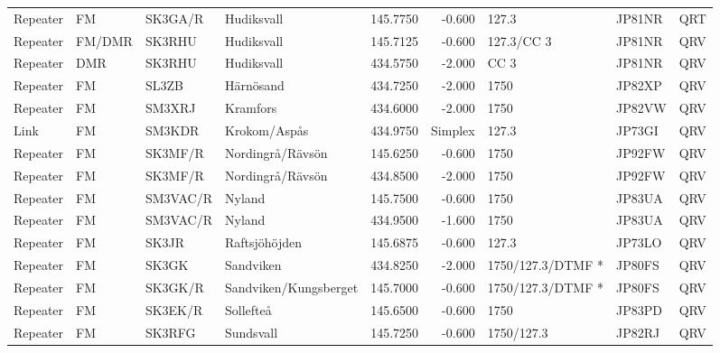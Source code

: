 \begin{landscape}
\begin{longtable}{llllrrlll}
	Repeater & FM              & SK3GA/R  & Hudiksvall            &     145.7750 &     -0.600 & 127.3              & JP81NR      & QRT      \\
	Repeater & FM/DMR          & SK3RHU   & Hudiksvall            &     145.7125 &     -0.600 & 127.3/CC 3         & JP81NR      & QRV      \\
	Repeater & DMR             & SK3RHU   & Hudiksvall            &     434.5750 &     -2.000 & CC 3               & JP81NR      & QRV      \\
	Repeater & FM              & SL3ZB    & Härnösand             &     434.7250 &     -2.000 & 1750               & JP82XP      & QRV      \\
	Repeater & FM              & SM3XRJ   & Kramfors              &     434.6000 &     -2.000 & 1750               & JP82VW      & QRV      \\
	Link     & FM              & SM3KDR   & Krokom/Aspås          &     434.9750 &    Simplex & 127.3              & JP73GI      & QRV      \\
	Repeater & FM              & SK3MF/R  & Nordingrå/Rävsön      &     145.6250 &     -0.600 & 1750               & JP92FW      & QRV      \\
	Repeater & FM              & SK3MF/R  & Nordingrå/Rävsön      &     434.8500 &     -2.000 & 1750               & JP92FW      & QRV      \\
	Repeater & FM              & SM3VAC/R & Nyland                &     145.7500 &     -0.600 & 1750               & JP83UA      & QRV      \\
	Repeater & FM              & SM3VAC/R & Nyland                &     434.9500 &     -1.600 & 1750               & JP83UA      & QRV      \\
	Repeater & FM              & SK3JR    & Raftsjöhöjden         &     145.6875 &     -0.600 & 127.3              & JP73LO      & QRV      \\
	Repeater & FM              & SK3GK    & Sandviken             &     434.8250 &     -2.000 & 1750/127.3/DTMF *  & JP80FS      & QRV      \\
	Repeater & FM              & SK3GK/R  & Sandviken/Kungsberget &     145.7000 &     -0.600 & 1750/127.3/DTMF *  & JP80FS      & QRV      \\
	Repeater & FM              & SK3EK/R  & Sollefteå             &     145.6500 &     -0.600 & 1750               & JP83PD      & QRV      \\
	Repeater & FM              & SK3RFG   & Sundsvall             &     145.7250 &     -0.600 & 1750/127.3         & JP82RJ      & QRV      \\

\end{longtable}
\end{landscape}
